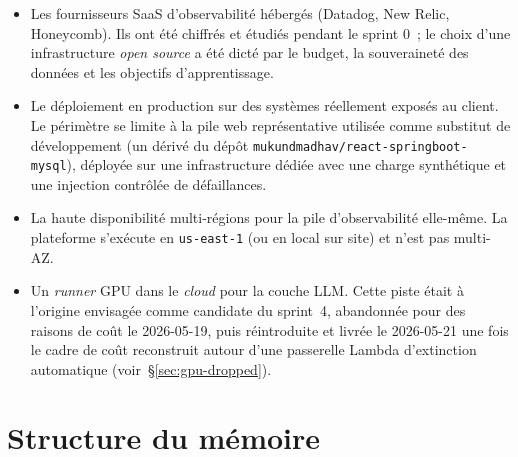 \documentclass[11pt,a4paper,oneside]{report}
\begin{document}
\begin{itemize}
  \item Les fournisseurs SaaS d'observabilité hébergés (Datadog,
        New Relic, Honeycomb). Ils ont été chiffrés et étudiés
        pendant le sprint 0~; le choix d'une infrastructure
        \emph{open source} a été dicté par le budget, la souveraineté
        des données et les objectifs d'apprentissage.
  \item Le déploiement en production sur des systèmes réellement
        exposés au client. Le périmètre se limite à la pile web
        représentative utilisée comme substitut de développement
        (un dérivé du dépôt
        \texttt{mukundmadhav/react-springboot-mysql}), déployée sur
        une infrastructure dédiée avec une charge synthétique et une
        injection contrôlée de défaillances.
  \item La haute disponibilité multi-régions pour la pile
        d'observabilité elle-même. La plateforme s'exécute en
        \texttt{us-east-1} (ou en local sur site) et n'est pas
        multi-AZ.
  \item Un \emph{runner} GPU dans le \emph{cloud} pour la couche LLM.
        Cette piste était à l'origine envisagée comme candidate du
        sprint~4, abandonnée pour des raisons de coût le 2026-05-19,
        puis réintroduite et livrée le 2026-05-21 une fois le cadre
        de coût reconstruit autour d'une passerelle Lambda
        d'extinction automatique (voir~\S\ref{sec:gpu-dropped}).
\end{itemize}

\section{Structure du mémoire}
\end{document}
